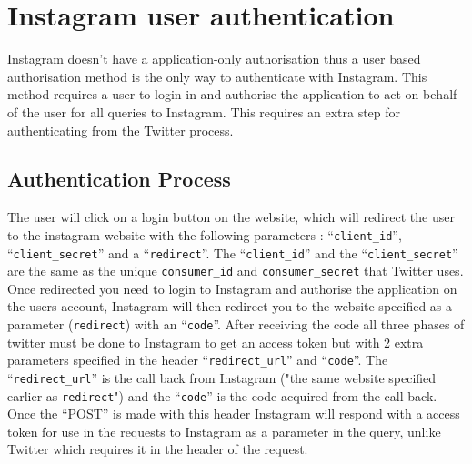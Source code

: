 \documentclass{article}
\begin{document}
\section{Instagram user authentication}
Instagram doesn't have a application-only authorisation thus a user based authorisation method is the only way to authenticate with Instagram. This method requires a user to login in and authorise the application to act on behalf of the user for all queries to Instagram. This requires an extra step for authenticating from the Twitter process.
\subsection{Authentication Process}
The user will click on a login button on the website, which will redirect the user to the instagram website with the following parameters : ``\verb+client_id+'', ``\verb+client_secret+'' and a ``\verb+redirect+''. The ``\verb+client_id+'' and the ``\verb+client_secret+'' are the same as the unique \verb+consumer_id+ and \verb+consumer_secret+ that Twitter uses. Once redirected you need to login to Instagram and authorise the application on the users account, Instagram will then redirect you to the website specified as a parameter (\verb+redirect+) with an ``\verb+code+''.
After receiving the code all three phases of twitter must be done to Instagram to get an access token but with 2 extra parameters specified in the header ``\verb+redirect_url+'' and ``\verb+code+''. The  ``\verb+redirect_url+'' is the call back from Instagram ("the same website specified earlier as \verb+redirect+") and the ``\verb+code+'' is the code acquired from the call back. Once the ``POST'' is made with this header Instagram will respond with a access token for use in the requests to Instagram as a parameter in the query, unlike Twitter which requires it in the header of the request. 
\end{document}
